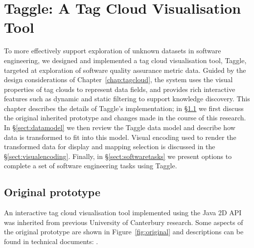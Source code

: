 \chapter[Taggle: A Tag Cloud Visualisation Tool]{Taggle: A Tag Cloud Visualisation Tool}


\label{chap:taggle}
\ifpdf
    \graphicspath{{Chapters/Taggle/TaggleFigs/PNG/}{Chapters/Taggle/TaggleFigs/PDF/}{Chapters/Taggle/TaggleFigs/}}
\else
    \graphicspath{{Chapters/Taggle/TaggleFigs/EPS/}{Chapters/Taggle/TaggleFigs/}}
\fi  

To more effectively support exploration of unknown datasets in software engineering, we designed and
implemented a tag cloud visualisation tool, Taggle, targeted at exploration of software quality assurance metric data. Guided by the design considerations of Chapter~\ref{chap:tagcloud}, the system uses the visual properties of tag clouds to represent data fields, and provides rich interactive features such as dynamic and static filtering to support knowledge discovery. This chapter describes the details of Taggle's implementation; in \S\ref{sect:original} we first discuss the original inherited prototype and changes made in the course of this research. In \S\ref{sect:datamodel} we then review the Taggle data model and describe how data is transformed to fit into this model. Visual encoding used to render the transformed data for display and mapping selection is discussed in the \S\ref{sect:visualencoding}. Finally, in \S\ref{sect:softwaretasks} we present options to complete a set of software engineering tasks using Taggle.

\section{Original prototype}\label{sect:original}

An interactive tag cloud visualisation tool implemented using the Java 2D API was inherited from previous University of Canterbury research. Some aspects of the original prototype are shown in Figure~\vref{fig:original} and descriptions can be found in technical documents: \citet{deaker11, deaker11b, deaker11c}.


